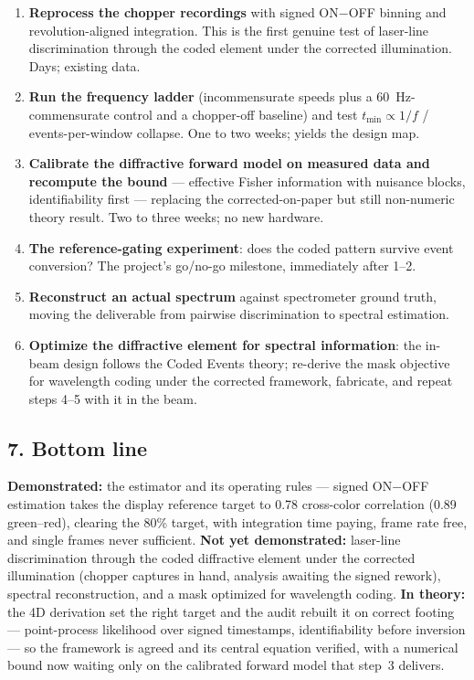\documentclass[11pt,a4paper]{article}
\newcommand{\heading}[1]{\subsection*{\color{reportblue}#1}}
\begin{document}
\begin{enumerate}
\item \textbf{Reprocess the chopper recordings} with signed ON$-$OFF binning and
      revolution-aligned integration. This is the first genuine test of laser-line
      discrimination through the coded element under the corrected illumination.
      Days; existing data.
\item \textbf{Run the frequency ladder} (incommensurate speeds plus a 60~Hz-commensurate
      control and a chopper-off baseline) and test $t_{\min} \propto 1/f$ /
      events-per-window collapse. One to two weeks; yields the design map.
\item \textbf{Calibrate the diffractive forward model on measured data and recompute
      the bound} --- effective Fisher information with nuisance blocks, identifiability
      first --- replacing the corrected-on-paper but still non-numeric theory result.
      Two to three weeks; no new hardware.
\item \textbf{The reference-gating experiment}: does the coded pattern survive event
      conversion? The project's go/no-go milestone, immediately after 1--2.
\item \textbf{Reconstruct an actual spectrum} against spectrometer ground truth,
      moving the deliverable from pairwise discrimination to spectral estimation.
\item \textbf{Optimize the diffractive element for spectral information}: the in-beam
      design follows the Coded Events theory; re-derive the mask objective for
      wavelength coding under the corrected framework, fabricate, and repeat
      steps 4--5 with it in the beam.
\end{enumerate}

\heading{7. Bottom line}

\textbf{Demonstrated:} the estimator and its operating rules --- signed ON$-$OFF
estimation takes the display reference target to 0.78 cross-color correlation
(0.89 green--red), clearing the 80\% target, with integration time paying, frame
rate free, and single frames never sufficient. \textbf{Not yet demonstrated:}
laser-line discrimination through the coded diffractive element under the corrected
illumination (chopper captures in hand, analysis awaiting the signed rework),
spectral reconstruction, and a mask optimized for wavelength coding. \textbf{In
theory:} the 4D derivation set the right target and the audit rebuilt it on correct
footing --- point-process likelihood over signed timestamps, identifiability before
inversion --- so the framework is agreed and its central equation verified, with a
numerical bound now waiting only on the calibrated forward model that step~3
delivers.
\end{document}
